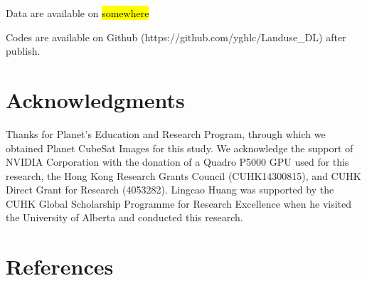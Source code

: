 \documentclass[preprint,12pt,authoryear]{elsarticle}
\begin{document}
Data are available on \hl{somewhere} 

Codes are available on Github (https://github.com/yghlc/Landuse\_DL) after publish. 

\section{Acknowledgments}
\label{sec_acknowledgments}

Thanks for Planet’s Education and Research Program, through which we obtained Planet CubeSat Images for this study. We acknowledge the support of NVIDIA Corporation with the donation of a Quadro P5000 GPU used for this research, the Hong Kong Research Grants Council (CUHK14300815), and CUHK Direct Grant for Research (4053282). Lingcao Huang was supported by the CUHK Global Scholarship Programme for Research Excellence when he visited the University of Alberta and conducted this research.





\section{References}
\label{sec_reference}

 



%
%
\end{document}
